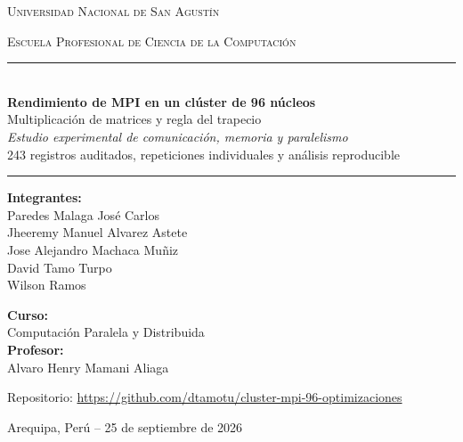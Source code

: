 \documentclass[11pt,a4paper]{article}
\begin{document}
\hypersetup{pageanchor=false}
\begin{titlepage}
    \centering
    \vspace*{1.2cm}
    {\scshape\LARGE Universidad Nacional de San Agustín \par}
    \vspace{0.3cm}
    {\scshape\large Escuela Profesional de Ciencia de la Computación \par}
    \vspace{2.1cm}
    \rule{\linewidth}{0.5mm}\\[0.4cm]
    {\huge\bfseries Rendimiento de MPI en un clúster de 96 núcleos\\[0.25cm]}
    {\Large Multiplicación de matrices y regla del trapecio\\[0.2cm]}
    {\normalsize\itshape Estudio experimental de comunicación, memoria y paralelismo\\[0.2cm]}
    {\normalsize 243 registros auditados, repeticiones individuales y análisis reproducible\\[0.35cm]}
    \rule{\linewidth}{0.5mm}
    \vspace{2.4cm}
    \begin{minipage}[t]{0.5\textwidth}
        \textbf{Integrantes:}\\
        Paredes Malaga José Carlos\\
        Jheeremy Manuel Alvarez Astete\\
        Jose Alejandro Machaca Muñiz\\
        David Tamo Turpo\\
        Wilson Ramos
    \end{minipage}
    \hfill
    \begin{minipage}[t]{0.42\textwidth}
        \raggedleft
        \textbf{Curso:}\\
        Computación Paralela y Distribuida\\[0.2cm]
        \textbf{Profesor:}\\
        Alvaro Henry Mamani Aliaga
    \end{minipage}
    \vfill
    {\large Repositorio: \url{https://github.com/dtamotu/cluster-mpi-96-optimizaciones}\par}
    {\large Arequipa, Perú -- 25 de septiembre de 2026\par}
\end{titlepage}
\hypersetup{pageanchor=true}
\tableofcontents
\clearpage
{}

\clearpage







\clearpage
\appendix

\end{document}
